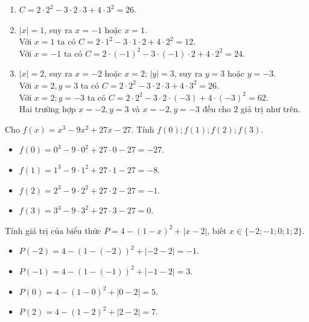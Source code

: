 \begin{bt}
{\begin{enumerate}
\begin{enumerate}
			\item  $C = 2\cdot 2^2 -3\cdot 2 \cdot 3 +4 \cdot 3^2 =26$.
			\item  $|x|=1$, suy ra $x=-1$ hoặc $x=1$.\\
			Với $x=1$ ta có $C = 2\cdot 1^2 -3 \cdot 1 \cdot 2 +4 \cdot 2^2 = 12$.\\
			Với $x=-1$ ta có $C =2 \cdot (-1)^2 -3 \cdot (-1) \cdot 2 + 4 \cdot 2^2 = 24$.
			\item  $|x|=2$, suy ra $x=-2$ hoặc $x=2$; $|y|=3$, suy ra $y=3$ hoặc $y=-3$.\\
			Với $x=2,y=3$ ta có $C= 2\cdot 2^2 -3\cdot 2 \cdot 3 +4 \cdot 3^2 = 26$.\\
			Với $x=2;y=-3$ ta có $C = 2\cdot 2^2 -3\cdot 2 \cdot (-3) +4 \cdot (-3)^2 = 62$.\\
			Hai trường hợp $x=-2,y=3$ và $x=-2,y=-3$ đều cho $2$ giá trị như trên.
		\end{enumerate}
		\end{enumerate}
	}
\end{bt}

\begin{bt}%
	Cho $f(x)=x^3-9x^2+27x-27$. Tính $f(0); f(1); f(2); f(3)$.
	\loigiai
	{ \begin{itemize}
			\item 	$f(0)=0^3-9\cdot 0^2+27\cdot 0 -27 = -27$.
			\item $f(1)= 1^3- 9 \cdot 1^2 +27 \cdot 1 -27 = -8$.
			\item $f(2) = 2^3 - 9\cdot 2^2 +27 \cdot 2 -27 = -1$.
			\item 	$f(3) = 3^3 - 9\cdot 3^2 +27 \cdot 3 -27 = 0$.
		\end{itemize}
	}
\end{bt}

\begin{bt}%
	Tính giá trị của biểu thức $P=4-(1-x)^2+|x-2|$, biết $x\in \{-2;-1;0;1;2\}$.
	\loigiai
	{ \begin{itemize}
			\item $P(-2)=4-\left(1-(-2)\right)^2 +|-2-2| = -1$.
			\item $P(-1)=4-\left(1-(-1)\right)^2 +|-1-2| = 3$.
			\item $P(0) = 4 - \left(1-0\right)^2 +|0-2| = 5$.
			\item $P(2) = 4 - \left(1-2\right)^2 +|2-2| = 7$.
		\end{itemize}  
	}
\end{bt}

